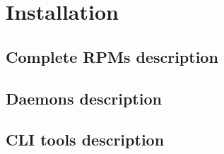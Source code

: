\section{Installation}

\subsection{Complete RPMs description}

\subsection{Daemons description}

\subsection{CLI tools description}
